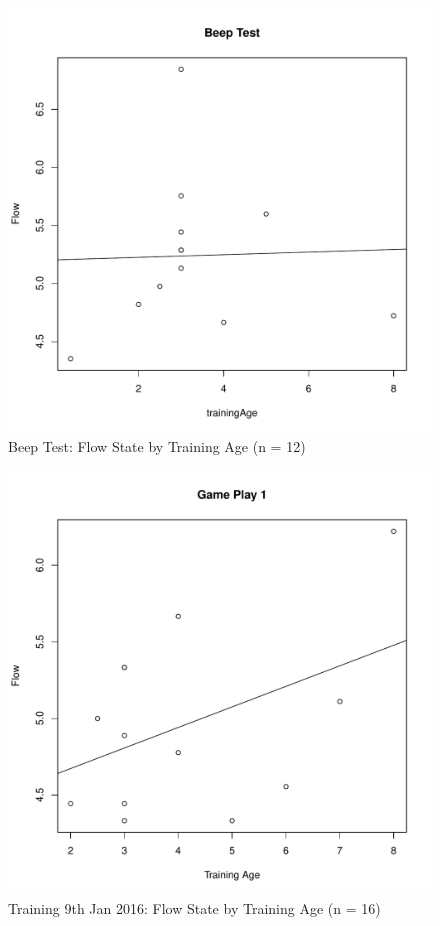 \begin{CJK}{UTF8}{gbsn}
\begin{figure}[htbp]
  \centering
\includegraphics[scale=.5]{images/beepFlowTrainingAge.pdf}
  \caption{Beep Test: Flow State by Training Age (n = 12)}
  \label{fig:beepFlowTrainingAge}
\end{figure}

\begin{figure}[htbp]
  \centering
\includegraphics[scale=.5]{images/flow0109TrainingAge.pdf}
  \caption{Training 9th Jan 2016: Flow State by Training Age (n = 16)}
  \label{fig:flow0109TrainingAge}
\end{figure}


\end{CJK}
